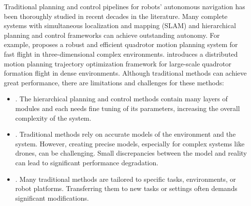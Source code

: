 \documentclass[letterpaper,journal,twoside]{IEEEtran}
\begin{document}
Traditional planning and control pipelines for robots' 
autonomous navigation has been thoroughly studied in recent
decades in the literature. 
Many complete systems with simultaneous localization 
and mapping (SLAM) and hierarchical 
planning and control frameworks can achieve outstanding 
autonomy.
For example, \cite{zhou2019robust} proposes a robust and efficient 
quadrotor motion planning system for fast flight in 
three-dimensional complex environments.
\cite{quan2023robust} introduces a distributed motion planning 
trajectory optimization framework for large-scale quadrotor 
formation flight in dense environments.
Although traditional methods can achieve great performance, 
there are limitations and challenges for these methods: 
\begin{itemize}
  \item {}. The hierarchical planning and control 
  methods contain many layers of modules and 
  each needs fine tuning of 
  its parameters, increasing the overall complexity of the system.
  \item {}. Traditional methods rely on 
  accurate models of the environment and the system. However, 
  creating precise models, especially for complex systems like 
  drones, can be challenging. Small discrepancies between the 
  model and reality can lead to significant performance 
  degradation. 
  \item {}. Many traditional methods are 
  tailored to specific tasks, environments, 
  or robot platforms. Transferring them 
  to new tasks or settings often demands significant 
  modifications. 
\end{itemize}
\end{document}
